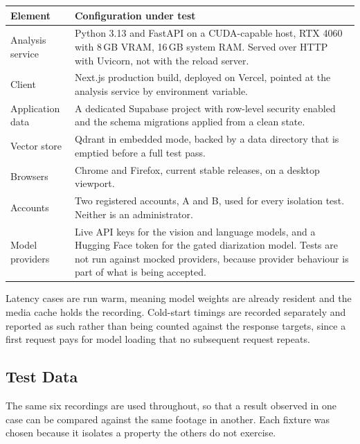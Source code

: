 \begin{table}[htbp]
\centering
\small
\begin{tabularx}{\textwidth}{@{}L{3.4cm}X@{}}
\toprule
\textbf{Element} & \textbf{Configuration under test} \\
\midrule
Analysis service & Python 3.13 and FastAPI on a CUDA-capable host, RTX 4060 with 8\,GB
VRAM, 16\,GB system RAM. Served over HTTP with Uvicorn, not with the reload server. \\
Client & Next.js production build, deployed on Vercel, pointed at the analysis service
by environment variable. \\
Application data & A dedicated Supabase project with row-level security enabled and the
schema migrations applied from a clean state. \\
Vector store & Qdrant in embedded mode, backed by a data directory that is emptied
before a full test pass. \\
Browsers & Chrome and Firefox, current stable releases, on a desktop viewport. \\
Accounts & Two registered accounts, A and B, used for every isolation test. Neither is
an administrator. \\
Model providers & Live API keys for the vision and language models, and a Hugging Face
token for the gated diarization model. Tests are not run against mocked providers,
because provider behaviour is part of what is being accepted. \\
\bottomrule
\end{tabularx}
\end{table}

Latency cases are run warm, meaning model weights are already resident and the media
cache holds the recording. Cold-start timings are recorded separately and reported as
such rather than being counted against the response targets, since a first request pays
for model loading that no subsequent request repeats.

\subsection{Test Data}

The same six recordings are used throughout, so that a result observed in one case can be
compared against the same footage in another. Each fixture was chosen because it isolates
a property the others do not exercise.

